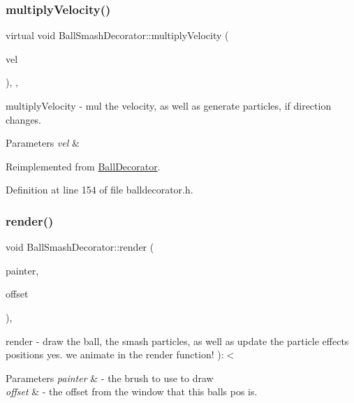 \subsubsection{\texorpdfstring{multiply\+Velocity()}{multiplyVelocity()}}
{\footnotesize\ttfamily virtual void Ball\+Smash\+Decorator\+::multiply\+Velocity (\begin{DoxyParamCaption}\item[{const Q\+Vector2D \&}]{vel }\end{DoxyParamCaption})\hspace{0.3cm}{\ttfamily [inline]}, {\ttfamily [override]}, {\ttfamily [virtual]}}



multiply\+Velocity -\/ mul the velocity, as well as generate particles, if direction changes. 


\begin{DoxyParams}{Parameters}
{\em vel} & \\
\hline
\end{DoxyParams}


Reimplemented from \mbox{\hyperlink{class_ball_decorator_ad1a9139a5c41d17d0eebf007afb984e7}{Ball\+Decorator}}.



Definition at line 154 of file balldecorator.\+h.

\mbox{\label{class_ball_smash_decorator_a8cbf47d481100f16f2376670fee9fdcc}} 
\subsubsection{\texorpdfstring{render()}{render()}}
{\footnotesize\ttfamily void Ball\+Smash\+Decorator\+::render (\begin{DoxyParamCaption}\item[{Q\+Painter \&}]{painter,  }\item[{const Q\+Vector2D \&}]{offset }\end{DoxyParamCaption})\hspace{0.3cm}{\ttfamily [override]}, {\ttfamily [virtual]}}



render -\/ draw the ball, the smash particles, as well as update the particle effects positions yes. we animate in the render function! )\+:$<$ 


\begin{DoxyParams}{Parameters}
{\em painter} & -\/ the brush to use to draw \\
\hline
{\em offset} & -\/ the offset from the window that this ball\textquotesingle{}s pos is. \\
\hline
\end{DoxyParams}


